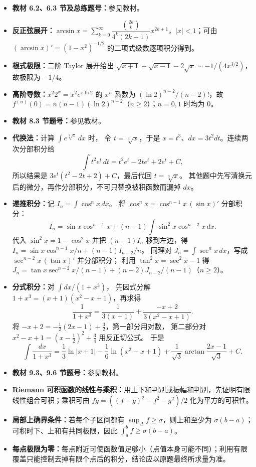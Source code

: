 \begin{itemize}
\item \textbf{教材 6.2、6.3 节及总练题号：}参见教材。
\item \textbf{反正弦展开：}$\arcsin x=\sum_{k=0}^{\infty}\dfrac{\binom{2k}{k}}{4^k(2k+1)}x^{2k+1}$，$|x|<1$；可由 $(\arcsin x)'=(1-x^2)^{-1/2}$ 的二项式级数逐项积分得到。
\item \textbf{根式极限：}二阶 Taylor 展开给出 $\sqrt{x+1}+\sqrt{x-1}-2\sqrt x\sim-1/(4x^{3/2})$，故极限为 $-1/4$。
\item \textbf{高阶导数：}$x^2 2^x=x^2e^{x\ln2}$ 的 $x^n$ 系数为 $(\ln2)^{n-2}/(n-2)!$，故 $f^{(n)}(0)=n(n-1)(\ln2)^{n-2}$（$n\ge2$）；$n=0,1$ 时均为 $0$。
\end{itemize}

\begin{itemize}
\item \textbf{教材 8.3 节题号：}参见教材。
\item \textbf{代换法：}计算 $\int e^{\sqrt[3]x}\,dx$ 时，
令 $t=\sqrt[3]x$，于是 $x=t^3$、$dx=3t^2dt$。连续两次分部积分给
\[
\int t^2e^t\,dt=t^2e^t-2te^t+2e^t+C,
\]
所以结果是 $3e^t(t^2-2t+2)+C$，最后代回 $t=\sqrt[3]x$。
其他题中先写清换元后的微分，再作分部积分，不可只替换被积函数而漏掉 $dx$。
\item \textbf{递推积分：}记 $I_n=\int\cos^n x\,dx$。
将 $\cos^n x=\cos^{n-1}x\,(\sin x)'$ 分部积分：
\[
I_n=\sin x\cos^{n-1}x
+(n-1)\int\sin^2x\cos^{n-2}x\,dx.
\]
代入 $\sin^2x=1-\cos^2x$ 并把 $(n-1)I_n$ 移到左边，得
$I_n=\sin x\cos^{n-1}x/n+(n-1)I_{n-2}/n$。
同理对 $J_n=\int\sec^n x\,dx$，写成
$\sec^{n-2}x\,(\tan x)'$ 并分部积分；
利用 $\tan^2x=\sec^2x-1$ 得
$J_n=\tan x\sec^{n-2}x/(n-1)+(n-2)J_{n-2}/(n-1)$（$n\ge2$）。
\item \textbf{分式积分：}对 $\int dx/(1+x^3)$，
先因式分解 $1+x^3=(x+1)(x^2-x+1)$，再求得
\[
\frac1{1+x^3}=\frac1{3(x+1)}+\frac{-x+2}{3(x^2-x+1)}.
\]
将 $-x+2=-\tfrac12(2x-1)+\tfrac32$，第一部分用对数，
第二部分对 $x^2-x+1=(x-\tfrac12)^2+\tfrac34$ 用反正切公式。
于是
\[
\int\frac{dx}{1+x^3}
=\frac13\ln|x+1|-\frac16\ln(x^2-x+1)
+\frac1{\sqrt3}\arctan\frac{2x-1}{\sqrt3}+C.
\]
\end{itemize}

\begin{itemize}
\item \textbf{教材 9.3、9.6 节题号：}参见教材。
\item \textbf{Riemann 可积函数的线性与乘积：}用上下和判别或振幅和判别，先证明有限线性组合可积；乘积可由 $fg=((f+g)^2-f^2-g^2)/2$ 化为平方的可积性。
\item \textbf{局部上确界条件：}若每个子区间都有 $\sup_\Delta f\ge\sigma$，则上和至少为 $\sigma(b-a)$；可积时下、上和有共同极限，因此 $\int_a^b f\ge\sigma(b-a)$。
\item \textbf{每点极限为零：}每点附近可使函数值足够小（点值本身可能不同）；利用有限覆盖只能控制去掉有限个点后的积分，结论应以原题最终所求量为准。
\end{itemize}

